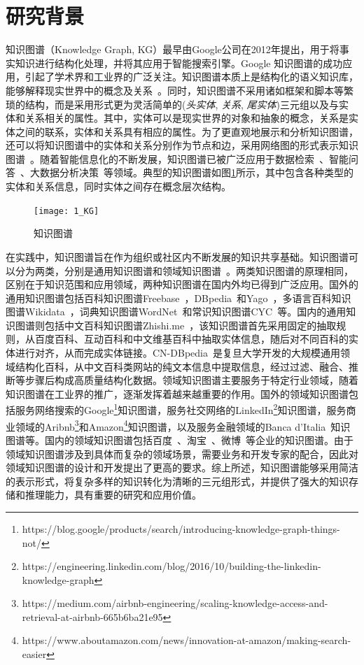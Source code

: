 \documentclass[algorithmlist, AutoFakeBold, AutoFakeSlant, figurelist, tablelist, nomlist, engineering]{seuthesix}
\begin{document}
\section{研究背景}
知识图谱（Knowledge Graph, KG）最早由Google公司在2012年提出，用于将事实知识进行结构化处理，并将其应用于智能搜索引擎。Google 知识图谱的成功应用，引起了学术界和工业界的广泛关注。知识图谱本质上是结构化的语义知识库，能够解释现实世界中的概念及关系~\cite{nickel2015review}。同时，知识图谱不采用诸如框架和脚本等繁琐的结构，而是采用形式更为灵活简单的(\textit{头实体}, \textit{关系}, \textit{尾实体})三元组以及与实体和关系相关的属性。其中，实体可以是现实世界的对象和抽象的概念，关系是实体之间的联系，实体和关系具有相应的属性。为了更直观地展示和分析知识图谱，还可以将知识图谱中的实体和关系分别作为节点和边，采用网络图的形式表示知识图谱~\cite{noy2019industry}。随着智能信息化的不断发展，知识图谱已被广泛应用于数据检索~\cite{rinaldi2021semantic,sarhan2021open,li2021research}、智能问答~\cite{li2021improving,do2021developing}、大数据分析决策~\cite{zhou2021geoscience,abu2021relational}等领域。典型的知识图谱如图\ref{1_KG}所示，其中包含各种类型的实体和关系信息，同时实体之间存在概念层次结构。
\begin{figure}[h]
  \centering
  \texttt{[image: 1\_KG]}
  \caption{知识图谱}
  \label{1_KG}
\end{figure}

在实践中，知识图谱旨在作为组织或社区内不断发展的知识共享基础。知识图谱可以分为两类，分别是通用知识图谱和领域知识图谱~\cite{hogan2021knowledge}。两类知识图谱的原理相同，区别在于知识范围和应用领域，两种知识图谱在国内外均已得到广泛应用。国外的通用知识图谱包括百科知识图谱Freebase~\cite{bollacker2007platform}，DBpedia~\cite{lehmann2015dbpedia}和Yago~\cite{hoffart2011yago2}，多语言百科知识图谱Wikidata~\cite{vrandevcic2014wikidata}，词典知识图谱WordNet~\cite{miller2007wordnet}和常识知识图谱CYC~\cite{lenat1995cyc}等。国内的通用知识图谱则包括中文百科知识图谱Zhishi.me~\cite{niu2011zhishi}，该知识图谱首先采用固定的抽取规则，从百度百科、互动百科和中文维基百科中抽取实体信息，随后对不同百科的实体进行对齐，从而完成实体链接。CN-DBpedia~\cite{xu2017cn}是复旦大学开发的大规模通用领域结构化百科，从中文百科类网站的纯文本信息中提取信息，经过过滤、融合、推断等步骤后构成高质量结构化数据。领域知识图谱主要服务于特定行业领域，随着知识图谱在工业界的推广，逐渐发挥着越来越重要的作用。国外的领域知识图谱包括服务网络搜索的Google\footnote{https://blog.google/products/search/introducing-knowledge-graph-things-not/}知识图谱，服务社交网络的LinkedIn\footnote{https://engineering.linkedin.com/blog/2016/10/building-the-linkedin-knowledge-graph}知识图谱，服务商业领域的Aribnb\footnote{https://medium.com/airbnb-engineering/scaling-knowledge-access-and-retrieval-at-airbnb-665b6ba21e95}和Amazon\footnote{https://www.aboutamazon.com/news/innovation-at-amazon/making-search-easier}知识图谱，以及服务金融领域的Banca d’Italia~\cite{bellomarini2019knowledge}知识图谱等。国内的领域知识图谱包括百度~\cite{wang2013xlore}、淘宝~\cite{xu2021alime}、微博~\cite{wei2020analysis}等企业的知识图谱。由于领域知识图谱涉及到具体而复杂的领域场景，需要业务和开发专家的配合，因此对领域知识图谱的设计和开发提出了更高的要求。综上所述，知识图谱能够采用简洁的表示形式，将复杂多样的知识转化为清晰的三元组形式，并提供了强大的知识存储和推理能力，具有重要的研究和应用价值。
\end{document}
